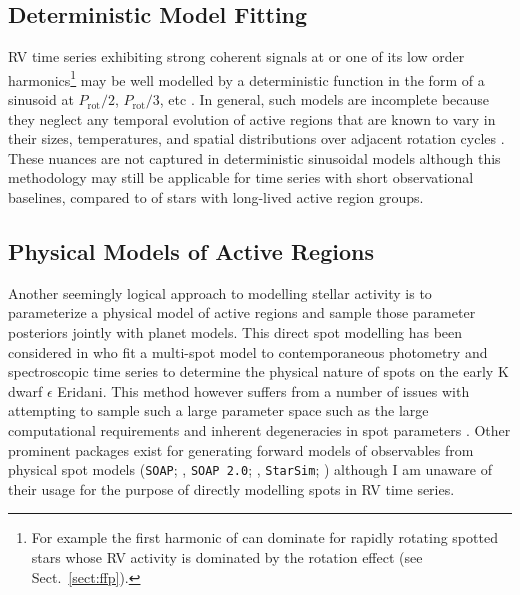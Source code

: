 \subsection{Deterministic Model Fitting}
RV time series exhibiting strong coherent signals at \prot{} or one of its low order
harmonics\footnote{For example the first harmonic of \prot{} can dominate for rapidly rotating
  spotted stars whose RV activity
  is dominated by the rotation effect (see Sect.~\ref{sect:ffp}).} may be well modelled by
a deterministic function in the form of a sinusoid at \prot{,} $P_{\text{rot}}/2$, $P_{\text{rot}}/3$,
etc \citep{boisse11}. In general, such models are incomplete because they neglect any temporal
evolution of active regions that are known to vary in their sizes, temperatures, and spatial distributions
over adjacent rotation cycles \citep{giles17}. These nuances are not captured in 
deterministic sinusoidal models although this methodology may still be applicable for time series
with short observational baselines, compared to \prot{,} of stars with long-lived active region groups.

\subsection{Physical Models of Active Regions}
Another seemingly logical approach to modelling stellar activity is to parameterize a physical model
of active regions and sample those parameter posteriors jointly with planet models. This direct
spot modelling has been considered in \cite{giguere16} who fit a multi-spot model
to contemporaneous photometry and spectroscopic time series to determine the physical nature of
spots on the early K dwarf $\epsilon$ Eridani. This method however
suffers from a number of issues with attempting to sample such a large parameter space
such as the large computational requirements and inherent degeneracies in spot parameters
\citep{giguere16}. Other prominent packages exist for generating forward models of observables
from physical spot models 
(\texttt{SOAP}; \citealt{boisse12}, \texttt{SOAP 2.0}; \citealt{dumusque14},
\texttt{StarSim}; \citealt{herrero16}) although I am unaware
of their usage for the purpose of directly modelling spots in RV time series.


